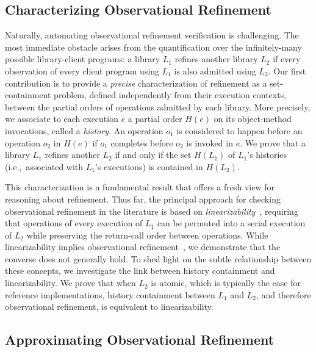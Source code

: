 \subsection{Characterizing Observational Refinement}
\label{sec:intro:histories}

Naturally, automating observational refinement verification is challenging. The
most immediate obstacle arises from the quantification over the infinitely-many
possible library-client programs: a library $L_1$ refines another library $L_2$
if every observation of every client program using $L_1$ is also admitted using
$L_2$. Our first contribution is to provide a \emph{precise} characterization
of refinement as a set-containment problem, defined independently from their
execution contexts, between the partial orders of operations admitted by each
library. More precisely, we associate to each execution $e$ a partial order
$H(e)$ on its object-method invocations, called a \emph{history}. An operation
$o_1$ is considered to happen before an operation $o_2$ in $H(e)$ if $o_1$
completes before $o_2$ is invoked in $e$. We prove that a library $L_1$ refines
another $L_2$ if and only if the set $H(L_1)$ of $L_1$'s histories
(i.e.,~associated with $L_1$'s executions) is contained in $H(L_2)$.

This characterization is a fundamental result that offers a fresh view for
reasoning about refinement. Thus far, the principal approach for checking
observational refinement in the literature is based on
\emph{linearizability}~\cite{journals/toplas/HerlihyW90}, requiring that
operations of every execution of $L_1$ can be permuted into a serial execution
of $L_2$ while preserving the return-call order between operations. While
linearizability implies observational
refinement~\cite{journals/tcs/FilipovicORY10}, we demonstrate that the converse
does not generally hold. To shed light on the subtle relationship between these
concepts, we investigate the link between history containment and
linearizability. We prove that when $L_2$ is atomic, which is typically the
case for reference implementations, history containment between $L_1$ and
$L_2$, and therefore observational refinement, is equivalent to linearizability.


\subsection{Approximating Observational Refinement}
\label{sec:intro:approx}

